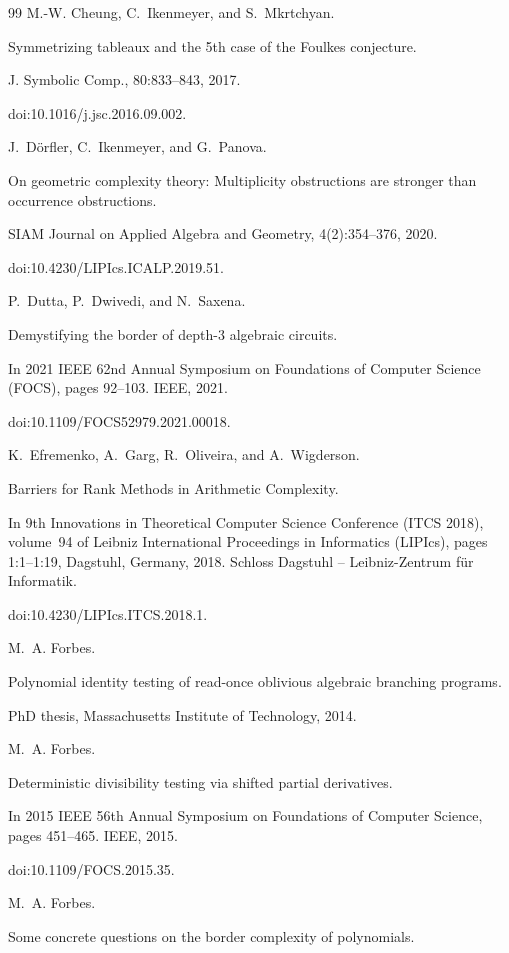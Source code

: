 \begin{thebibliography}{99}
M.-W. Cheung, C. Ikenmeyer, and S. Mkrtchyan.


Symmetrizing tableaux and the 5th case of the Foulkes conjecture.


J. Symbolic Comp., 80:833–843, 2017.


doi:10.1016/j.jsc.2016.09.002.

J. Dörfler, C. Ikenmeyer, and G. Panova.


On geometric complexity theory: Multiplicity obstructions are
stronger than occurrence obstructions.


SIAM Journal on Applied Algebra and Geometry, 4(2):354–376,
2020.


doi:10.4230/LIPIcs.ICALP.2019.51.

P. Dutta, P. Dwivedi, and N. Saxena.


Demystifying the border of depth-3 algebraic circuits.


In 2021 IEEE 62nd Annual Symposium on Foundations of Computer
Science (FOCS), pages 92–103. IEEE, 2021.


doi:10.1109/FOCS52979.2021.00018.

K. Efremenko, A. Garg, R. Oliveira, and A. Wigderson.


Barriers for Rank Methods in Arithmetic Complexity.


In 9th Innovations in Theoretical Computer Science Conference
(ITCS 2018), volume 94 of Leibniz International Proceedings in
Informatics (LIPIcs), pages 1:1–1:19, Dagstuhl, Germany, 2018. Schloss
Dagstuhl – Leibniz-Zentrum für Informatik.


doi:10.4230/LIPIcs.ITCS.2018.1.

M. A. Forbes.


Polynomial identity testing of read-once oblivious algebraic
branching programs.


PhD thesis, Massachusetts Institute of Technology, 2014.

M. A. Forbes.


Deterministic divisibility testing via shifted partial derivatives.


In 2015 IEEE 56th Annual Symposium on Foundations of Computer
Science, pages 451–465. IEEE, 2015.


doi:10.1109/FOCS.2015.35.

M. A. Forbes.


Some concrete questions on the border complexity of polynomials.



\end{thebibliography}
